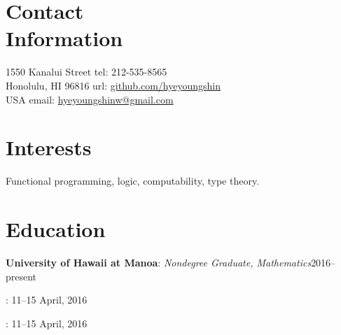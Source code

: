 \documentclass[margin,line]{resume}
\begin{document}
\newcommand{\Hawaii}{Hawai\kern.05em`\kern.05em\relax i}
\newcommand{\Manoa}{M\=anoa}


\begin{resume}

    \section{\mysidestyle Contact\\Information}
     1550 Kanalui Street            \hfill tel: 212-535-8565\\
     Honolulu, HI 96816                 \hfill url: \href{https://github.com/hyeyoungshin}{github.com/hyeyoungshin}\\
     USA  \hfill             \hfill email:  \href{mailto:hyeyoungshinw@gmail.com}{hyeyoungshinw@gmail.com}

    \section{\mysidestyle Interests}

    Functional programming, logic, computability, type theory.
    
    \section{\mysidestyle Education}

    \textbf{University of Hawaii at Manoa}:  %
    \textsl{Nondegree Graduate, Mathematics}\hfill 2016--present

    \textbf{}: %
    \hfill 11--15 April,
    2016 

    \textbf{}: %
    \hfill 11--15 April, 2016 


\end{resume}
\end{document}
